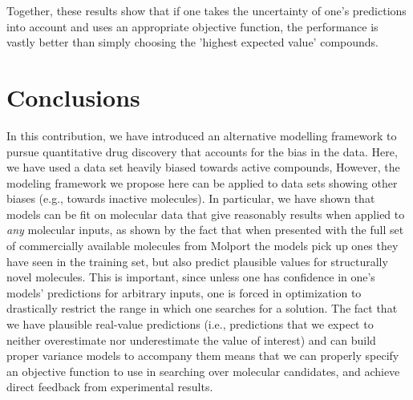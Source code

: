 \documentclass[journal=jacsat,manuscript=article]{achemso}
\begin{document}
\newline
\newline

Together, these results show that if one takes the uncertainty of one's predictions into account and uses an appropriate objective function, the performance is vastly better than simply choosing the 'highest expected value' compounds.


\section*{Conclusions}
In this contribution, 
we have introduced an alternative modelling framework to pursue quantitative drug discovery that accounts for the bias in the data. %
Here, we have used a data set heavily biased towards active compounds, 
However, the modeling framework we propose here can be applied to data sets showing other biases (e.g., towards inactive molecules).
In particular, we have shown that models can be fit on molecular data that give reasonably results when applied to \textit{any} molecular inputs, as shown by the fact that when presented with the full set of commercially available molecules from Molport the models pick up ones they have seen in the training set, but also predict plausible values for structurally novel molecules.
This is important, since unless one has confidence in one's models' predictions for arbitrary inputs, one is forced in optimization to drastically restrict the range in which one searches for a solution. The fact that we have plausible real-value predictions (i.e., predictions that we expect to neither overestimate nor underestimate the value of interest) and can build proper variance models to accompany them means that we can properly specify an objective function to use in searching over molecular candidates, and achieve direct feedback from experimental results. 
\end{document}
